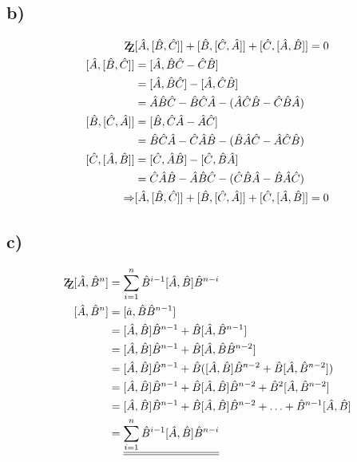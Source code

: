     \subsection{b)}
    \begin{align*}
    \mathrm{Z\kern-.3em\raise-0.5ex\hbox{Z}} &[\hat A , [\hat B , \hat C]] + [\hat B ,[\hat C, \hat A]]+ [\hat C,[\hat A , \hat B]] =0\\
    [\hat A , [\hat B , \hat C]] &= [\hat A, \hat B \hat C - \hat C \hat B] \\
    &=[\hat A , \hat B \hat C] -[\hat A , \hat C \hat B]\\
    &= \hat A \hat B \hat C -\hat B \hat C \hat A- (\hat A \hat C \hat B-\hat C \hat B \hat A)\\
    [\hat B , [\hat C , \hat A]] &= [\hat B, \hat C \hat A-\hat A \hat C]\\
    &= \hat B \hat C \hat A - \hat C \hat A \hat B - (\hat B \hat A \hat C - \hat A \hat C \hat B)\\
    [\hat C , [\hat A , \hat B]] &= [\hat C , \hat A \hat B]- [\hat C , \hat B \hat A]\\
    &= \hat C \hat A \hat B - \hat A \hat B \hat C -(\hat C \hat B \hat A - \hat B \hat A \hat C)\\
    \Rightarrow &[\hat A , [\hat B , \hat C]] + [\hat B , [\hat C , \hat A]] +[\hat C , [\hat A , \hat B]] = 0
    \end{align*}
    \subsection{c)}
    \begin{align*}
    \mathrm{Z\kern-.3em\raise-0.5ex\hbox{Z}} [\hat A , \hat B ^n] &= \sum_{i=1}^n \hat B ^{i-1} [\hat A , \hat B ] \hat B ^{n-i}\\
    [\hat A , \hat B ^n] &= [\hat a , \hat B \hat B ^{n-1}]\\
    &= [\hat A , \hat B] \hat B ^{n-1} + \hat B [\hat A , \hat B ^{n-1}]\\
    &= [\hat A , \hat B] \hat B ^{n-1} + \hat B [\hat A , \hat B \hat B ^{n-2}] \\
    &= [\hat A , \hat B] \hat B ^{n-1} + \hat B ([\hat A , \hat B] \hat B ^{n-2} + \hat B [\hat A , \hat B ^ {n-2} ] )\\
    &= [\hat A , \hat B] \hat B ^{n-1} + \hat B [\hat A , \hat B] \hat B ^{n-2} + \hat B ^2 [\hat  A , \hat B ^{n-2}]\\
    &= [\hat A , \hat B] \hat B ^{n-1} + \hat B [\hat A, \hat B] \hat B ^{n-2} + \hdots + \hat B ^{n-1} [\hat A , \hat B]\\
    &=\underline{\underline{ \sum_{i=1}^n \hat B ^{i-1} [\hat A , \hat B] \hat B ^{n-i}}}
    \end{align*}
